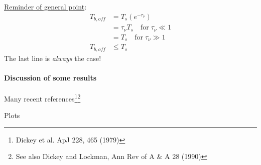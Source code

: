 \documentclass[11pt]{article}
\newcommand{\mar}[1]{\hspace{0pt}\marginpar{-\textcolor{black}{#1}-}}
\begin{document}
\underline{Reminder of general point}:
\begin{align*}
    T_{b,off} &= T_{s} \left( e^{-\tau_{\nu}} \right)\\
    &= \tau_{\nu}T_{s}\quad \mathrm{for}\; \tau_{\nu} \ll 1\\
    &= T_{s}\quad \mathrm{for}\; \tau_{\nu} \gg 1\\
    T_{b,off} &\leq T_{s}
\end{align*}
The last line is \emph{always} the case!

\paragraph{Discussion of some results}
Many recent references\footnote{
    Dickey et al. ApJ 228, 465 (1979)}\footnote{
    See also Dickey and Lockman, Ann Rev of A \& A 28 (1990)}

\mar{44}Plots
\end{document}
